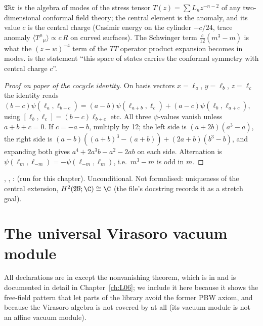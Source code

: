 \begin{physics}
$\mathfrak{Vir}$ is the algebra of modes of the stress tensor $T(z) = \sum L_nz^{-n-2}$ of any
two-dimensional conformal field theory; the central element is the anomaly, and its value $c$ is
the central charge (Casimir energy on the cylinder $-c/24$, trace anomaly
$\langle T^\mu{}_\mu\rangle\propto c\,R$ on curved surfaces). The Schwinger term
$\frac{c}{12}(m^3-m)$ is what the $(z-w)^{-4}$ term of the $TT$ operator product expansion becomes in
modes.  is the statement ``this space of states carries the conformal symmetry with
central charge $c$''.
\end{physics}

\begin{proof}[Proof on paper of the cocycle identity]
On basis vectors $x = \ell_a$, $y=\ell_b$, $z=\ell_c$ the identity reads
$(b-c)\psi(\ell_a,\ell_{b+c}) = (a-b)\psi(\ell_{a+b},\ell_c) + (a-c)\psi(\ell_b,\ell_{a+c})$,
using $[\ell_b,\ell_c] = (b-c)\ell_{b+c}$ etc. All three $\psi$-values vanish unless $a+b+c=0$. If
$c = -a-b$, multiply by 12; the left side is $(a+2b)(a^3-a)$, the right side is
$(a-b)((a+b)^3-(a+b)) + (2a+b)(b^3-b)$, and expanding both gives
$a^4+2a^3b-a^2-2ab$ on each side. Alternation is $\psi(\ell_m,\ell_{-m}) = -\psi(\ell_{-m},\ell_m)$,
i.e.\ $m^3-m$ is odd in $m$.
\end{proof}

\begin{status}
\allowbreak{}\allowbreak{}, \allowbreak{}, :
 (run for this chapter). Unconditional.
Not formalised: uniqueness of the central extension, $H^2(\ltwoW;\C)\cong\C$ (the file's docstring
records it as a stretch goal).
\end{status}

\section{The universal Virasoro vacuum module}\label{l02:sec:virmod}

All declarations are in  except the
nonvanishing theorem, which is in  and is
documented in detail in Chapter~\ref{ch:L06}; we include it here because it shows the free-field
pattern that let parts of the library avoid the former PBW axiom, and because the Virasoro algebra
is not covered by  at all (its vacuum module is not an affine vacuum module).

